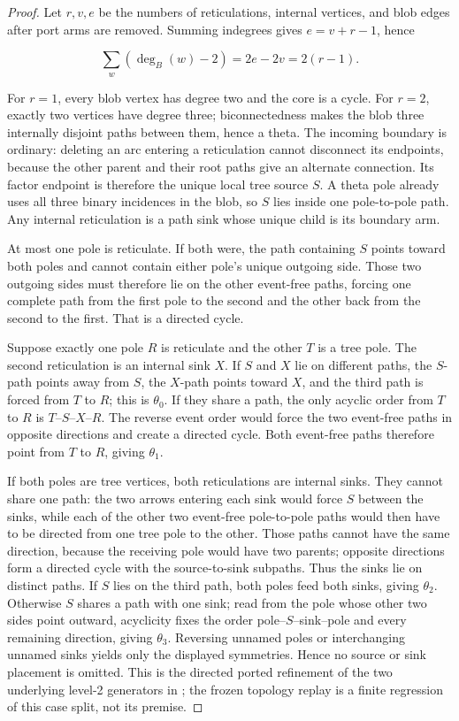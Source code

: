 \begin{proof}
Let \(r,v,e\) be the numbers of reticulations, internal vertices, and blob
edges after port arms are removed.  Summing indegrees gives
\(e=v+r-1\), hence

\[
 \sum_w(\deg_B(w)-2)=2e-2v=2(r-1).
\]

For \(r=1\), every blob vertex has degree two and the core is a cycle.  For
\(r=2\), exactly two vertices have degree three; biconnectedness makes the
blob three internally disjoint paths between them, hence a theta.  The
incoming boundary is ordinary: deleting an arc entering a reticulation cannot
disconnect its endpoints, because the other parent and their root paths give
an alternate connection.  Its factor endpoint is therefore the unique local
tree source \(S\).  A theta pole already uses all three binary incidences in
the blob, so \(S\) lies inside one pole-to-pole path.  Any internal
reticulation is a path sink whose unique child is its boundary arm.

At most one pole is reticulate.  If both were, the path containing \(S\)
points toward both poles and cannot contain either pole's unique outgoing
side.  Those two outgoing sides must therefore lie on the other event-free
paths, forcing one complete path from the first pole to the second and the
other back from the second to the first.  That is a directed cycle.

Suppose exactly one pole \(R\) is reticulate and the other \(T\) is a tree
pole.  The second reticulation is an internal sink \(X\).  If \(S\) and \(X\)
lie on different paths, the \(S\)-path points away from \(S\), the
\(X\)-path points toward \(X\), and the third path is forced from \(T\) to
\(R\); this is \(\theta_0\).  If they share a path, the only acyclic order
from \(T\) to \(R\) is \(T\)--\(S\)--\(X\)--\(R\).  The reverse event order
would force the two event-free paths in opposite directions and create a
directed cycle.  Both event-free paths therefore point from \(T\) to \(R\),
giving \(\theta_1\).

If both poles are tree vertices, both reticulations are internal sinks.  They
cannot share one path: the two arrows entering each sink would force \(S\)
between the sinks, while each of the other two event-free pole-to-pole paths
would then have to be directed from one tree pole to the other.  Those paths
cannot have the same direction, because the receiving pole would have two
parents; opposite directions form a directed cycle with the
source-to-sink subpaths.  Thus the sinks lie on distinct paths.  If \(S\)
lies on the third path, both poles feed both sinks, giving \(\theta_2\).
Otherwise \(S\) shares a path with one sink; read from the pole whose other
two sides point outward, acyclicity fixes the order
pole--\(S\)--sink--pole and every remaining direction, giving
\(\theta_3\).  Reversing unnamed poles or interchanging unnamed sinks yields
only the displayed symmetries.  Hence no source or sink placement is omitted.
This is the directed ported refinement of the two underlying
level-2 generators in \cite{HuberEtAl2025}; the frozen topology replay is a
finite regression of this case split, not its premise.
\end{proof}


